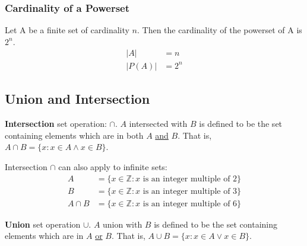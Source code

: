 \subsubsection*{Cardinality of a Powerset}

Let A be a finite set of cardinality $n$. Then the cardinality of the powerset of A is $2^n$.
\begin{align*}
  \left\lvert A\right\rvert    & = n   \\
  \left\lvert P(A)\right\rvert & = 2^n
\end{align*}

\subsection{Union and Intersection}

\textbf{Intersection} set operation: $\cap$.
$A$ intersected with $B$ is defined to be the set containing elements which are in both $A$ \underline{and} $B$.
That is, $A \cap B = \{x: x \in A \land x \in B\}$.
\begin{center}
\end{center}

Intersection $\cap$ can also apply to infinite sets:
\begin{align*}
  A        & =\{x \in \mathbb{Z}: x \text{ is an integer multiple of 2}\}  \\
  B        & =\{x \in \mathbb{Z}: x \text{ is an integer multiple of 3}\}  \\
  A \cap B & = \{x \in \mathbb{Z}: x \text{ is an integer multiple of 6}\}
\end{align*}

\noindent \textbf{Union} set operation $\cup$.
$A$ union with $B$ is defined to be the set containing elements which are in $A$ \underline{or} $B$.
That is, $A \cup B = \{x: x \in A \lor x \in B\}$.
\begin{center}
\end{center}

